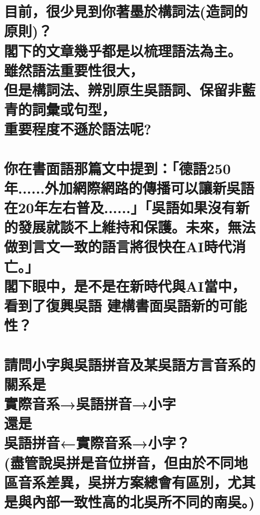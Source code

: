 \chapter[目前，很少見到你著墨於構詞法(造詞的原則)？ 閣下的文章幾乎都是以梳理語法為主。 雖然語法重要性很大， 但是構詞法、辨別原生吳語詞、保留非藍青的詞彙或句型， 重要程度不遜於語法呢?]{目前，很少見到你著墨於構詞法(造詞的原則)？ \\[0.35em] 閣下的文章幾乎都是以梳理語法為主。 \\[0.35em] 雖然語法重要性很大， \\[0.35em] 但是構詞法、辨別原生吳語詞、保留非藍青的詞彙或句型， \\[0.35em] 重要程度不遜於語法呢?}

\chapter[你在書面語那篇文中提到：「德語250年......外加網際網路的傳播可以讓新吳語在20年左右普及......」「吳語如果沒有新的發展就談不上維持和保護。未來，無法做到言文一致的語言將很快在AI時代消亡。」 閣下眼中，是不是在新時代與AI當中， 看到了復興吳語 建構書面吳語新的可能性？]{你在書面語那篇文中提到：「德語250年......外加網際網路的傳播可以讓新吳語在20年左右普及......」「吳語如果沒有新的發展就談不上維持和保護。未來，無法做到言文一致的語言將很快在AI時代消亡。」 \\[0.35em] 閣下眼中，是不是在新時代與AI當中， \\[0.35em] 看到了復興吳語 建構書面吳語新的可能性？}

\chapter[請問小字與吳語拼音及某吳語方言音系的關系是 實際音系→吳語拼音→小字 還是 吳語拼音←實際音系→小字？ (盡管說吳拼是音位拼音，但由於不同地區音系差異，吳拼方案總會有區別，尤其是與內部一致性高的北吳所不同的南吳。)]{請問小字與吳語拼音及某吳語方言音系的關系是 \\[0.35em] 實際音系→吳語拼音→小字 \\[0.35em] 還是 \\[0.35em] 吳語拼音←實際音系→小字？ \\[0.35em] (盡管說吳拼是音位拼音，但由於不同地區音系差異，吳拼方案總會有區別，尤其是與內部一致性高的北吳所不同的南吳。)}

